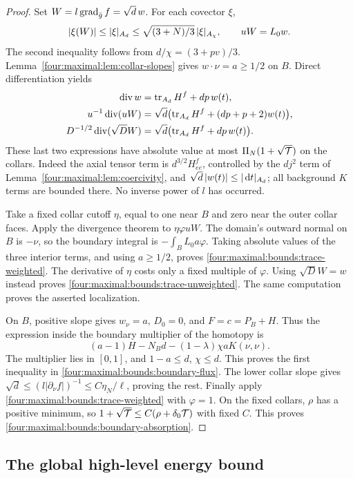 \begin{proof}
Set $W=l\operatorname{grad}_{\bar g}f=\sqrt d\,w$. For each covector $\xi$,
\[
 |\xi(W)|\le|\xi|_{A_d}
       \le\sqrt{(3+N)/3}\,|\xi|_{A_\chi},\qquad uW=L_0w.
\]
The second inequality follows from $d/\chi=(3+pv)/3$.
Lemma~\ref{four:maximal:lem:collar-slopes} gives $w\cdot\nu=a\ge1/2$ on $B$.
Direct differentiation yields
\begin{align*}
 \operatorname{div} w&=\operatorname{tr}_{A_d}H^f+dp\,w(t),\\
 u^{-1}\operatorname{div}(uW)
 &=\sqrt d\bigl(\operatorname{tr}_{A_d}H^f+(dp+p+2)w(t)\bigr),\\
 D^{-1/2}\operatorname{div}(\sqrt D W)
 &=\sqrt d\bigl(\operatorname{tr}_{A_d}H^f+dp\,w(t)\bigr).
\end{align*}
These last two expressions have absolute value at most
$\Pi_N(1+\sqrt{\mathcal T})$ on the collars. Indeed the axial tensor term is
$d^{3/2}H^f_{ee}$, controlled by the $d j^2$ term of
Lemma~\ref{four:maximal:lem:coercivity}, and
$\sqrt d\,|w(t)|\le|\,\mathrm d t|_{A_d}$; all background $K$ terms are
bounded there. No inverse power of $l$ has occurred.

Take a fixed collar cutoff $\eta$, equal to one near $B$ and zero
near the outer collar faces. Apply the divergence theorem to
$\eta\varphi uW$. The domain's outward normal on $B$ is $-\nu$,
so the boundary integral is $-\int_B L_0a\varphi$.
Taking absolute values of the three interior terms, and using
$a\ge1/2$, proves \eqref{four:maximal:bounds:trace-weighted}.
The derivative of $\eta$ costs only a fixed multiple of $\varphi$.
Using $\sqrt D W=w$ instead proves \eqref{four:maximal:bounds:trace-unweighted}.
The same computation proves the asserted localization.

On $B$, positive slope gives $w_\nu=a$, $D_0=0$, and
$F=c=P_B+H$. Thus the expression inside the boundary multiplier of
the homotopy is
\[
 (a-1)H-N_Bd-(1-\lambda)\chi aK(\nu,\nu).
\]
The multiplier lies in $[0,1]$, and $1-a\le d$, $\chi\le d$.
This proves the first inequality in \eqref{four:maximal:bounds:boundary-flux}.
The lower collar slope gives
$\sqrt d\le(l|\partial_\nu f|)^{-1}\le C\eta_N/\ell$,
proving the rest. Finally apply \eqref{four:maximal:bounds:trace-weighted} with
$\varphi=1$. On the fixed collars, $\rho$ has a positive minimum, so
$1+\sqrt{\mathcal T}\le C(\rho+\delta_0\mathcal T)$ with fixed $C$.
This proves \eqref{four:maximal:bounds:boundary-absorption}.
\end{proof}

\subsection{The global high-level energy bound}

